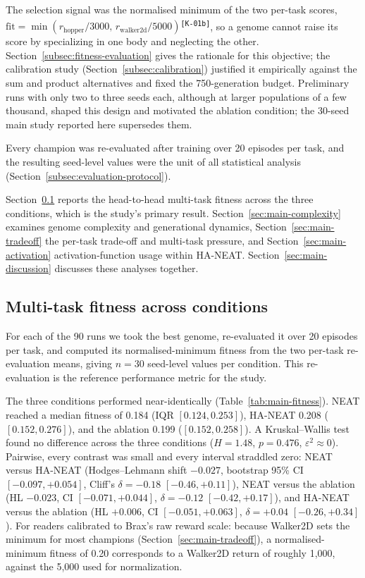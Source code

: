 \documentclass[12pt]{article}
\newcommand{\cohID}[1]{\textsuperscript{\scriptsize\texttt{[#1]}}}
\newcommand{\cohConsistency}[2]{\textcolor{cohConsistency}{#2}\cohID{#1}}
\begin{document}
\cohConsistency{K-01b}{The selection signal was the normalised minimum of the two per-task scores, $\mathrm{fit} = \min(r_{\text{hopper}}/3000,\, r_{\text{walker2d}}/5000)$}, so a genome cannot raise its score by specializing in one body and neglecting the other.
Section~\ref{subsec:fitness-evaluation} gives the rationale for this objective; the calibration study (Section~\ref{subsec:calibration}) justified it empirically against the sum and product alternatives and fixed the 750-generation budget.
Preliminary runs with only two to three seeds each, although at larger populations of a few thousand, shaped this design and motivated the ablation condition; the 30-seed main study reported here supersedes them.

Every champion was re-evaluated after training over 20 episodes per task, and the resulting seed-level values were the unit of all statistical analysis (Section~\ref{subsec:evaluation-protocol}).

Section~\ref{sec:main-study} reports the head-to-head multi-task fitness across the three conditions, which is the study's primary result.
Section~\ref{sec:main-complexity} examines genome complexity and generational dynamics, Section~\ref{sec:main-tradeoff} the per-task trade-off and multi-task pressure, and Section~\ref{sec:main-activation} activation-function usage within HA-NEAT.
Section~\ref{sec:main-discussion} discusses these analyses together.

\subsection{Multi-task fitness across conditions}
\label{sec:main-study}
For each of the 90 runs we took the best genome, re-evaluated it over 20 episodes per task, and computed its normalised-minimum fitness from the two per-task re-evaluation means, giving $n = 30$ seed-level values per condition.
This re-evaluation is the reference performance metric for the study.

The three conditions performed near-identically (Table~\ref{tab:main-fitness}).
NEAT reached a median fitness of 0.184 (IQR $[0.124, 0.253]$), HA-NEAT 0.208 ($[0.152, 0.276]$), and the ablation 0.199 ($[0.152, 0.258]$).
A Kruskal--Wallis test found no difference across the three conditions ($H = 1.48$, $p = 0.476$, $\varepsilon^2 \approx 0$).
Pairwise, every contrast was small and every interval straddled zero: NEAT versus HA-NEAT (Hodges--Lehmann shift $-0.027$, bootstrap 95\% CI $[-0.097, +0.054]$, Cliff's $\delta = -0.18$ $[-0.46, +0.11]$), NEAT versus the ablation (HL $-0.023$, CI $[-0.071, +0.044]$, $\delta = -0.12$ $[-0.42, +0.17]$), and HA-NEAT versus the ablation (HL $+0.006$, CI $[-0.051, +0.063]$, $\delta = +0.04$ $[-0.26, +0.34]$).
For readers calibrated to Brax's raw reward scale: because Walker2D sets the minimum for most champions (Section~\ref{sec:main-tradeoff}), a normalised-minimum fitness of 0.20 corresponds to a Walker2D return of roughly 1{,}000, against the 5{,}000 used for normalization.
\end{document}
